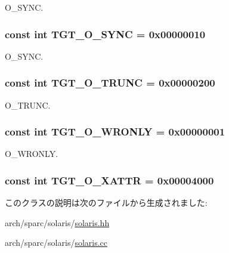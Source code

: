O\_\-SYNC. \hypertarget{classSparcSolaris_abf43ab05d2a5b6b8113952160d8565db}{
\subsubsection[{TGT\_\-O\_\-SYNC}]{\setlength{\rightskip}{0pt plus 5cm}const int {\bf TGT\_\-O\_\-SYNC} = 0x00000010}}
\label{classSparcSolaris_abf43ab05d2a5b6b8113952160d8565db}


O\_\-SYNC. \hypertarget{classSparcSolaris_a4f892ee6e1424a2becd859b0bef1f18b}{
\subsubsection[{TGT\_\-O\_\-TRUNC}]{\setlength{\rightskip}{0pt plus 5cm}const int {\bf TGT\_\-O\_\-TRUNC} = 0x00000200}}
\label{classSparcSolaris_a4f892ee6e1424a2becd859b0bef1f18b}


O\_\-TRUNC. \hypertarget{classSparcSolaris_a6156c069cefe05ce3cce033b2e0c2de2}{
\subsubsection[{TGT\_\-O\_\-WRONLY}]{\setlength{\rightskip}{0pt plus 5cm}const int {\bf TGT\_\-O\_\-WRONLY} = 0x00000001}}
\label{classSparcSolaris_a6156c069cefe05ce3cce033b2e0c2de2}


O\_\-WRONLY. \hypertarget{classSparcSolaris_a1f98faca34578b4879065b3d10902e40}{
\subsubsection[{TGT\_\-O\_\-XATTR}]{\setlength{\rightskip}{0pt plus 5cm}const int {\bf TGT\_\-O\_\-XATTR} = 0x00004000}}
\label{classSparcSolaris_a1f98faca34578b4879065b3d10902e40}


このクラスの説明は次のファイルから生成されました:\begin{DoxyCompactItemize}
\item 
arch/sparc/solaris/\hyperlink{arch_2sparc_2solaris_2solaris_8hh}{solaris.hh}\item 
arch/sparc/solaris/\hyperlink{solaris_8cc}{solaris.cc}\end{DoxyCompactItemize}
